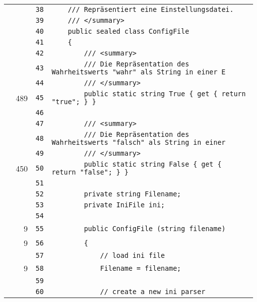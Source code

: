 \documentclass[a4paper,10pt]{article}
\begin{document}
\begin{longtable}[l]{lrrl}
\cellcolor{gray} &  & \verb~38~ & \verb~    /// Repräsentiert eine Einstellungsdatei.~\\
\cellcolor{gray} &  & \verb~39~ & \verb~    /// </summary>~\\
\cellcolor{gray} &  & \verb~40~ & \verb~    public sealed class ConfigFile~\\
\cellcolor{gray} &  & \verb~41~ & \verb~    {~\\
\cellcolor{gray} &  & \verb~42~ & \verb~        /// <summary>~\\
\cellcolor{gray} &  & \verb~43~ & \verb~        /// Die Repräsentation des Wahrheitswerts "wahr" als String in einer E~\\
\cellcolor{gray} &  & \verb~44~ & \verb~        /// </summary>~\\
\cellcolor{green} & 489 & \verb~45~ & \verb~        public static string True { get { return "true"; } }~\\
\cellcolor{gray} &  & \verb~46~ & \verb~~\\
\cellcolor{gray} &  & \verb~47~ & \verb~        /// <summary>~\\
\cellcolor{gray} &  & \verb~48~ & \verb~        /// Die Repräsentation des Wahrheitswerts "falsch" als String in einer~\\
\cellcolor{gray} &  & \verb~49~ & \verb~        /// </summary>~\\
\cellcolor{green} & 450 & \verb~50~ & \verb~        public static string False { get { return "false"; } }~\\
\cellcolor{gray} &  & \verb~51~ & \verb~~\\
\cellcolor{gray} &  & \verb~52~ & \verb~        private string Filename;~\\
\cellcolor{gray} &  & \verb~53~ & \verb~        private IniFile ini;~\\
\cellcolor{gray} &  & \verb~54~ & \verb~~\\
\cellcolor{green} & 9 & \verb~55~ & \verb~        public ConfigFile (string filename)~\\
\cellcolor{green} & 9 & \verb~56~ & \verb~        {~\\
\cellcolor{gray} &  & \verb~57~ & \verb~            // load ini file~\\
\cellcolor{green} & 9 & \verb~58~ & \verb~            Filename = filename;~\\
\cellcolor{gray} &  & \verb~59~ & \verb~~\\
\cellcolor{gray} &  & \verb~60~ & \verb~            // create a new ini parser~\\

\end{longtable}
\end{document}
